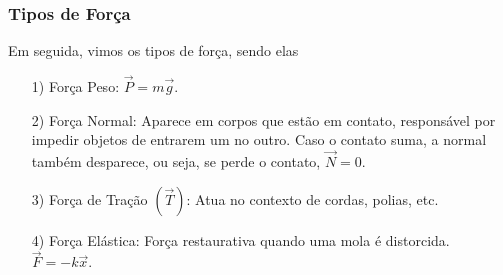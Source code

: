 \documentclass[PhysicsI/physics_notes.tex]{subfiles}
\begin{document}
\subsubsection{Tipos de Força}
Em seguida, vimos os tipos de força, sendo elas
\begin{itemize}
	\item[1)] Força Peso: $\vec{P} = m \vec{g}.$
	\item[2)] Força Normal: Aparece em corpos que estão em contato, responsável por impedir objetos de entrarem um no outro.
	      Caso o contato suma, a normal também desparece, ou seja, se perde o contato, $\vec{N} = 0.$
	\item[3)] Força de Tração $(\vec{T})$: Atua no contexto de cordas, polias, etc.
	\item[4)] Força Elástica: Força restaurativa quando uma mola é distorcida. $\vec{F} = -k \vec{x}.$
\end{itemize}
\end{document}
